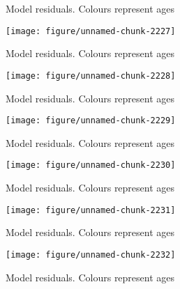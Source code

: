 \documentclass[a4paper]{article}\usepackage{graphicx, color}
\makeatletter
\def\maxwidth{ %
  \ifdim\Gin@nat@width>\linewidth
    \linewidth
  \else
    \Gin@nat@width
  \fi
}
\newenvironment{knitrout}{}{} %
\makeatother
\begin{document}
\begin{knitrout}
\begin{figure}[H]
\caption[Model residuals]{Model residuals. Colours represent ages\label{fig:unnamed-chunk-2226}}
\end{figure}
\begin{figure}[H]


{\centering \texttt{[image: figure/unnamed-chunk-2227]} 

}

\caption[Model residuals]{Model residuals. Colours represent ages\label{fig:unnamed-chunk-2227}}
\end{figure}
\begin{figure}[H]


{\centering \texttt{[image: figure/unnamed-chunk-2228]} 

}

\caption[Model residuals]{Model residuals. Colours represent ages\label{fig:unnamed-chunk-2228}}
\end{figure}
\begin{figure}[H]


{\centering \texttt{[image: figure/unnamed-chunk-2229]} 

}

\caption[Model residuals]{Model residuals. Colours represent ages\label{fig:unnamed-chunk-2229}}
\end{figure}
\begin{figure}[H]


{\centering \texttt{[image: figure/unnamed-chunk-2230]} 

}

\caption[Model residuals]{Model residuals. Colours represent ages\label{fig:unnamed-chunk-2230}}
\end{figure}
\begin{figure}[H]


{\centering \texttt{[image: figure/unnamed-chunk-2231]} 

}

\caption[Model residuals]{Model residuals. Colours represent ages\label{fig:unnamed-chunk-2231}}
\end{figure}
\begin{figure}[H]


{\centering \texttt{[image: figure/unnamed-chunk-2232]} 

}

\caption[Model residuals]{Model residuals. Colours represent ages\label{fig:unnamed-chunk-2232}}
\end{figure}
\begin{figure}[H]



\end{figure}
\end{knitrout}
\end{document}
